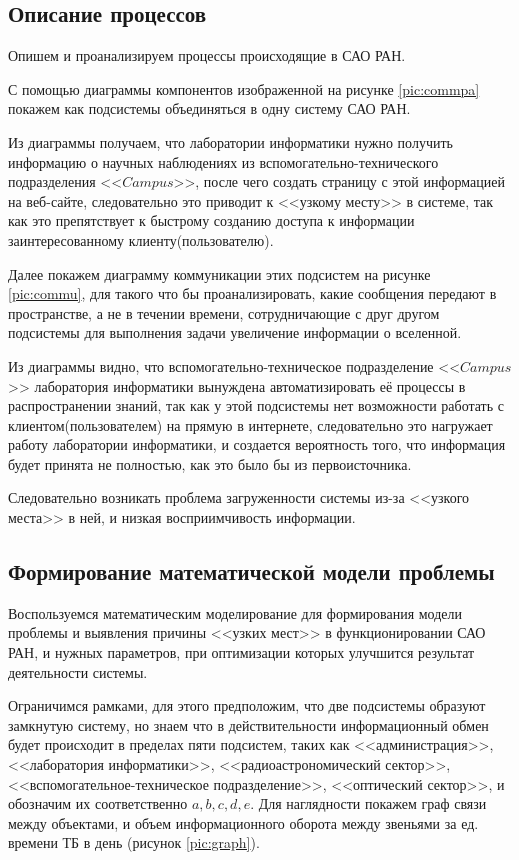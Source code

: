    
\subsection{Описание процессов}

Опишем и проанализируем процессы происходящие в САО РАН. 

С помощью диаграммы компонентов изображенной на рисунке \ref{pic:commpa} покажем как подсистемы объединяться в одну систему САО РАН. 

Из диаграммы получаем, что лаборатории информатики нужно получить информацию о научных наблюдениях из вспомогательно-технического подразделения <<$Campus$>>, после чего создать страницу с этой информацией на веб-сайте, следовательно это приводит к <<узкому месту>> в системе, так как это препятствует к быстрому созданию доступа к информации заинтересованному клиенту(пользователю).

Далее покажем диаграмму коммуникации этих подсистем на рисунке \ref{pic:commu}, для такого что бы проанализировать, какие сообщения передают в пространстве, а не в течении времени, сотрудничающие с друг другом подсистемы для выполнения задачи увеличение информации о вселенной.


Из диаграммы видно, что вспомогательно-техническое подразделение <<$Campus$>> лаборатория информатики вынуждена автоматизировать её процессы в распространении знаний, так как у этой подсистемы нет возможности работать с клиентом(пользователем) на прямую в интернете, следовательно это нагружает работу лаборатории информатики, и создается вероятность того, что информация будет принята не полностью, как это было бы из первоисточника.

Следовательно возникать проблема загруженности системы из-за <<узкого места>> в ней, и низкая восприимчивость информации. 


\subsection{Формирование математической модели проблемы}
Воспользуемся математическим моделирование для формирования модели проблемы и выявления причины <<узких мест>> в функционировании САО РАН, и нужных параметров, при оптимизации которых улучшится результат деятельности системы.

Ограничимся рамками, для этого предположим, что две подсистемы образуют замкнутую систему, но знаем что в действительности информационный обмен будет происходит в пределах пяти подсистем, таких как <<администрация>>, <<лаборатория информатики>>, <<радиоастрономический сектор>>, <<вспомогательное-техническое подразделение>>, <<оптический сектор>>, и обозначим их соответственно $a, b, c, d, e$. Для наглядности покажем граф связи между объектами, и объем информационного оборота между звеньями за ед. времени ТБ в день (рисунок \ref{pic:graph}).

